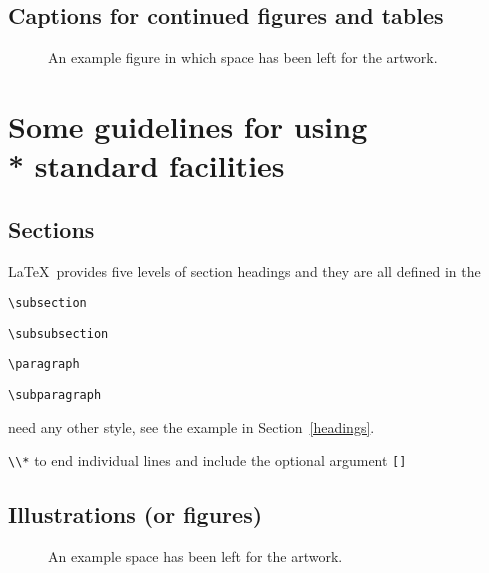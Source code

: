 \subsection{Captions for continued figures and tables}

 \begin{figure}
     \vspace{5.5cm}
     \caption{An example figure in which space has been left for the artwork.}\label{sample-figure}
  \end{figure}

\section[]{Some guidelines for using\\* standard facilities}

\subsection{Sections}

\LaTeX\ provides five levels of section headings and they are all defined in the
\begin{description}
  \item \verb"\subsection"
  \item \verb"\subsubsection"
  \item \verb"\paragraph"
  \item \verb"\subparagraph"
\end{description}

need any other style, see the example in Section~\ref{headings}.

\verb"\\*" to end individual lines and include the optional argument \verb"[]" 

\subsection{Illustrations (or figures)}

\begin{figure*}
 \vspace{5.5cm}
  \caption{An example space has been left for the artwork.}\label{twocol-figure}
\end{figure*}

